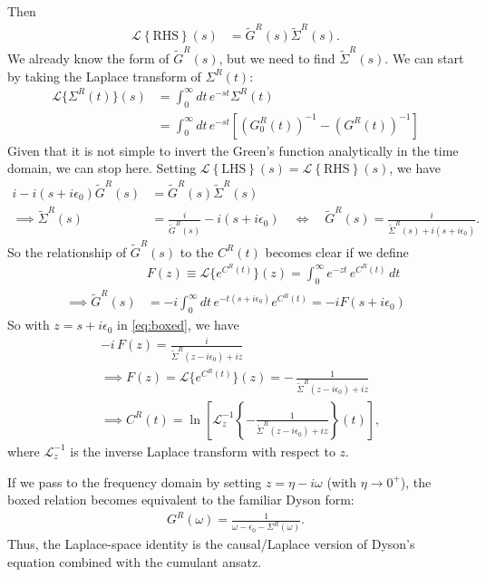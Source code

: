Then
\begin{align}
\mathcal{L}\left\{\text{RHS}\right\}(s) &=\tilde{G}^R(s) \tilde{\Sigma}^R(s).
\end{align}
We already know the form of $\tilde{G}^R(s)$, but we need to find $\tilde{\Sigma}^R(s)$. We can start by taking the Laplace transform of $\Sigma^R(t)$:
\begin{align}
\mathcal{L}\{\Sigma^R(t)\}(s)&=\int_0^\infty dt\, e^{-s t} \Sigma^R(t) \\
&=\int_0^\infty dt\, e^{-s t} \left[ \left(G_0^R(t)\right)^{-1} - \left(G^R(t)\right)^{-1} \right]
\end{align}
Given that it is not simple to invert the Green's function analytically in the time domain, we can stop here. \color{red}{But perhaps you can think of certain limits where this inversion is possible to do numerically?} \color{black}Setting $\mathcal{L}\left\{\text{LHS}\right\}(s)=\mathcal{L}\left\{\text{RHS}\right\}(s)$, we have
\begin{align}
i - i(s + i\epsilon_0)\tilde{G}^R(s) &= \tilde{G}^R(s) \tilde{\Sigma}^R(s) \\
\implies \tilde{\Sigma}^R(s)
&= \frac{i}{\tilde{G}^R(s)} - i(s + i\epsilon_0)
\quad\Longleftrightarrow\quad
\tilde{G}^R(s)
= \frac{i}{\tilde{\Sigma}^R(s) + i(s + i\epsilon_0)}. \label{eq:boxed}
\end{align}
So the relationship of $\tilde{G}^R(s)$ to the $C^R(t) $ becomes clear if we define
\begin{align}
&F(z) \equiv \mathcal{L}\{e^{C^R(t)}\}(z)
= \int_0^\infty e^{-z t}\,e^{C^R(t)}\,dt\\
\implies \tilde{G}^R(s) &= -i \int_0^\infty dt\, e^{-t(s + i\epsilon_0)} e^{C^R(t)} = -i F(s + i\epsilon_0)
\end{align}
So with
$z = s + i\epsilon_0$ in \eqref{eq:boxed}, we have
\begin{align}
&-i\,F(z)
= \frac{i}{\tilde{\Sigma}^R(z - i\epsilon_0) + i z}\\
&\implies 
F(z)
= \mathcal{L}\{e^{C^R(t)}\}(z)
= -\,\frac{1}{\tilde{\Sigma}^R(z - i\epsilon_0) + i z}\\
& \implies
C^R(t)
= \ln\!\left[
\mathcal{L}^{-1}_z
\left\{
-\frac{1}{\tilde{\Sigma}^R(z - i\epsilon_0) + i z}
\right\}(t)
\right],
\end{align}
where $\mathcal{L}^{-1}_z$ is the inverse Laplace transform with respect to $z$.

If we pass to the frequency domain by setting
$z = \eta - i\omega$ (with $\eta \to 0^+$),
the boxed relation becomes equivalent to the familiar Dyson form:
\begin{align}
G^R(\omega)
= \frac{1}{\omega - \epsilon_0 - \Sigma^R(\omega)}.
\end{align}
Thus, the Laplace-space identity is the causal/Laplace version of
Dyson’s equation combined with the cumulant ansatz.

